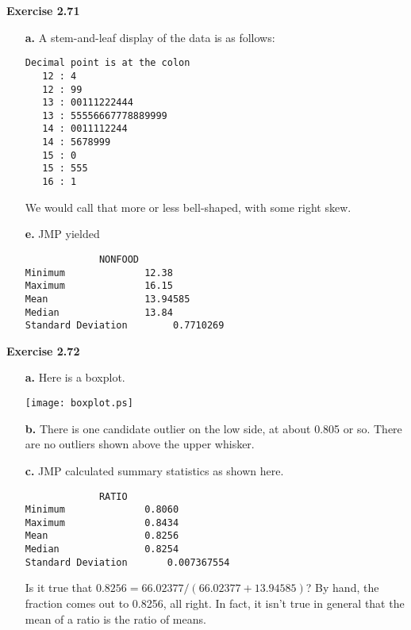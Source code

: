 \documentclass[10pt]{article}
\begin{document}
{\bf Exercise 2.71}
\begin{itemize}
\item[\bf a.] A stem-and-leaf display of the data is as follows:
\begin{verbatim}
Decimal point is at the colon
   12 : 4
   12 : 99
   13 : 00111222444
   13 : 55556667778889999
   14 : 0011112244
   14 : 5678999
   15 : 0
   15 : 555
   16 : 1
\end{verbatim}
We would call that more or less bell-shaped, with some right skew.      
\item[\bf e.] JMP yielded 
\begin{verbatim}
             NONFOOD
Minimum              12.38
Maximum              16.15
Mean                 13.94585
Median               13.84
Standard Deviation        0.7710269  
\end{verbatim}                     
\end{itemize}

{\bf Exercise 2.72}
\begin{itemize}
\item[\bf a.] Here is a boxplot.

\centerline{\texttt{[image: boxplot.ps]}}
 
\item[\bf b.] There is one candidate outlier on the low side, at about 
0.805 or so. There are no outliers shown above the upper whisker.
\item[\bf c.] JMP calculated summary statistics as shown here.
\begin{verbatim}
             RATIO
Minimum              0.8060
Maximum              0.8434
Mean                 0.8256
Median               0.8254
Standard Deviation       0.007367554
\end{verbatim}  
Is it true that $0.8256=66.02377/(66.02377+13.94585)$? By hand, the 
fraction comes out to 0.8256, all right. In fact, it isn't true in 
general that the mean of a ratio is the ratio of means. 
\end{itemize}
\end{document}
